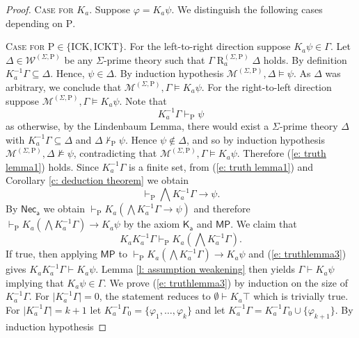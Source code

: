 \documentclass{myifcolog}
\newcommand{\K}{K}
\newcommand{\agi}{a}
\newcommand{\fw}{\mathcal{M}}
\newcommand{\Rel}{\mathrel{R}}
\newcommand{\W}{\mathcal{W}}
\newcommand{\hick}{\mathrm{ICK}}
\newcommand{\hickt}{\mathrm{ICKT}}
\newcommand{\hickp}{\mathrm{P}}
\numberwithin{theorem}{section}
\begin{document}
\begin{proof}
    \noindent \textsc{Case for $\K_\agi$.} Suppose $\varphi = \K_\agi \psi$. We distinguish the following cases depending on $\hickp$. \smallskip
   
    \setlength{\leftskip}{0.5cm} \noindent \textsc{Case for $\hickp \in \{\hick, \hickt\}$}.  For the left-to-right direction suppose $\K_\agi \psi \in \Gamma$. Let $\Delta \in \W^{(\Sigma, \hickp)}$ be any $\Sigma$-prime theory such that $\Gamma \Rel_\agi^{(\Sigma, \hickp)} \Delta$ holds. By definition $\K_\agi^{-1} \Gamma \subseteq \Delta$. Hence, $\psi \in \Delta$. By induction hypothesis $\fw^{(\Sigma, \hickp)}, \Delta \models \psi$. As $\Delta$ was arbitrary, we conclude that $\fw^{(\Sigma, \hickp)}, \Gamma \models \K_\agi \psi$. For the right-to-left direction suppose $\fw^{(\Sigma, \hickp)}, \Gamma \models \K_\agi \psi$. Note that
    \begin{equation}\label{e: truth lemma1}
        \K_\agi^{-1} \Gamma \vdash_\mathrm{P} \psi
    \end{equation}
     as otherwise, by the Lindenbaum Lemma, there would exist a $\Sigma$-prime theory $\Delta$ with $\K_\agi^{-1} \Gamma \subseteq \Delta$ and $\Delta \not \vdash_\mathrm{P} \psi$. Hence $\psi \not \in \Delta$, and so by induction hypothesis $\fw^{(\Sigma, \hickp)}, \Delta \not \models \psi$, contradicting that $\fw^{(\Sigma, \hickp)}, \Gamma \models \K_\agi \psi$. Therefore (\ref{e: truth lemma1}) holds. Since $\K_\agi^{-1}\Gamma$ is a finite set, from (\ref{e: truth lemma1}) and Corollary \ref{c: deduction theorem} we obtain
    \begin{equation}\label{e: truthlemma2}
        \vdash_\mathrm{P} \bigwedge \K_\agi^{-1} \Gamma \rightarrow \psi.
    \end{equation}
    By $\mathsf{Nec_\agi}$ we obtain $\vdash_\mathrm{P} \K_\agi (\bigwedge \K_\agi^{-1} \Gamma \rightarrow \psi) $ and therefore $\vdash_\mathrm{P} \K_\agi (\bigwedge \K_\agi^{-1} \Gamma) \rightarrow \K_\agi \psi$ by the axiom $\mathsf{K_\agi}$ and $\mathsf{MP}$. We claim that
    \begin{equation}\label{e: truthlemma3}
         \K_\agi \K_\agi^{-1} \Gamma \vdash_\mathrm{P} \K_\agi (\bigwedge \K_\agi^{-1} \Gamma).
    \end{equation}
    If true, then applying $\mathsf{MP}$ to $\vdash_\mathrm{P} \K_\agi (\bigwedge \K_\agi^{-1} \Gamma) \rightarrow \K_\agi \psi$ and (\ref{e: truthlemma3}) gives $\K_\agi \K_\agi^{-1} \Gamma \vdash \K_\agi \psi$. Lemma \ref{l: assumption weakening} then yields $\Gamma \vdash \K_\agi \psi$ implying that $\K_\agi \psi \in \Gamma$. We prove (\ref{e: truthlemma3}) by induction on the size of $\K_\agi^{-1} \Gamma$. For $\lvert \K_\agi^{-1} \Gamma \rvert = 0$, the statement reduces to $\emptyset \vdash \K_\agi \top$ which is trivially true. For $\lvert \K_\agi^{-1} \Gamma \rvert = k+1$ let $\K_\agi^{-1}\Gamma_0 = \{ \varphi_1, \ldots, \varphi_k\}$ and let $\K_\agi^{-1}\Gamma = \K_\agi^{-1} \Gamma_0 \cup \{ \varphi_{k+1}\}$. By induction hypothesis

\end{proof}
\end{document}
